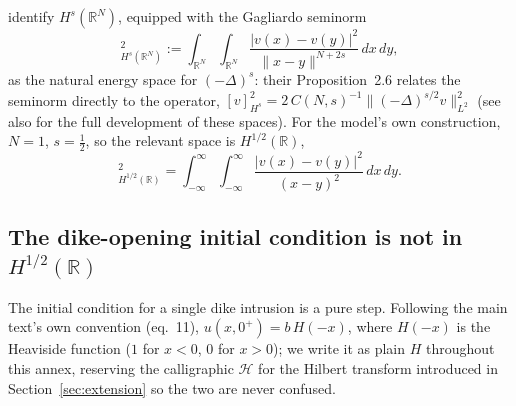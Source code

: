 \documentclass{article}
\newcommand{\HT}{\mathcal{H}}
\begin{document}
\citet{daoud2022fractional} identify $H^s(\mathbb{R}^N)$, equipped with the
Gagliardo seminorm
\begin{equation}
[v]_{H^s(\mathbb{R}^N)}^2 := \int_{\mathbb{R}^N}\!\int_{\mathbb{R}^N}
  \frac{|v(x)-v(y)|^2}{\|x-y\|^{N+2s}}\,dx\,dy,
\label{frac:gagliardo}
\end{equation}
as the natural energy space for $(-\Delta)^s$: their Proposition~2.6 relates
the seminorm directly to the operator, $[v]_{H^s}^2 = 2\,C(N,s)^{-1}
\|(-\Delta)^{s/2}v\|_{L^2}^2$ (see also \citealp{dinezza2012hitchhikers} for
the full development of these spaces). For the model's own construction,
$N=1$, $s=\tfrac12$, so the relevant space is $H^{1/2}(\mathbb{R})$,
\begin{equation}
[v]_{H^{1/2}(\mathbb{R})}^2 = \int_{-\infty}^{\infty}\!\int_{-\infty}^{\infty}
  \frac{|v(x)-v(y)|^2}{(x-y)^2}\,dx\,dy.
\label{frac:gagliardo12}
\end{equation}

\subsection{The dike-opening initial condition is not in $H^{1/2}(\mathbb{R})$}
\label{sec:heaviside}

The initial condition for a single dike intrusion is a pure step. Following
the main text's own convention (eq.~11), $u(x,0^+) = b\,H(-x)$, where
$H(-x)$ is the Heaviside function ($1$ for $x<0$, $0$ for $x>0$); we write
it as plain $H$ throughout this annex, reserving the calligraphic $\HT$ for
the Hilbert transform introduced in Section~\ref{sec:extension} so the two
are never confused.
\end{document}
